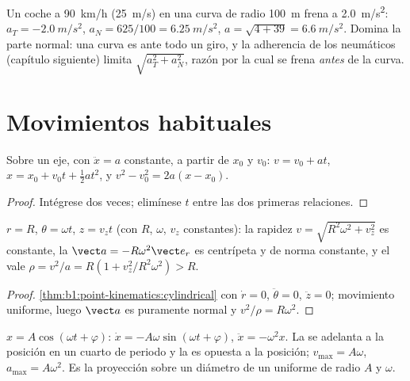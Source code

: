 \begin{example}\label{ex:b1:point-kinematics:bend}
Un coche a \qty{90}{km/h} (\qty{25}{m/s}) en una curva de radio
\qty{100}{m} frena a \qty{2.0}{m/s^2}: $a_T = \qty{-2.0}{m/s^2}$, $a_N = 625/100 =
\qty{6.25}{m/s^2}$, $a = \sqrt{4 + 39} = \qty{6.6}{m/s^2}$. Domina la
parte normal: una curva es ante todo un giro, y la adherencia de los
neumáticos (capítulo siguiente) limita $\sqrt{a_T^2 + a_N^2}$, razón por
la cual se frena \emph{antes} de la curva.
\end{example}

\section{Movimientos habituales}

\begin{proposition}\label{prop:b1:point-kinematics:uarm}
Sobre un eje, con $\ddot x = a$ constante, a partir de $x_0$ y $v_0$:
$v = v_0 + at$, $x = x_0 + v_0t + \tfrac12 at^2$, y
$v^2 - v_0^2 = 2a(x - x_0)$.
\end{proposition}

\begin{proof}
Intégrese dos veces; elimínese $t$ entre las dos primeras relaciones.
\end{proof}

\begin{proposition}\label{prop:b1:point-kinematics:helix}
$r = R$, $\theta = \omega t$, $z = v_zt$ (con $R$, $\omega$, $v_z$
constantes): la rapidez $v = \sqrt{R^2\omega^2 + v_z^2}$ es constante, la
 $\vect a = -R\omega^2\vect e_r$ es centrípeta y de norma
constante, y el  vale $\rho = v^2/a = R(1 + v_z^2/R^2\omega^2) > R$.
\end{proposition}

\begin{proof}
\cref{thm:b1:point-kinematics:cylindrical} con $\dot r = 0$,
$\ddot\theta = 0$, $\ddot z = 0$; movimiento uniforme, luego $\vect a$ es
puramente normal y $v^2/\rho = R\omega^2$.
\end{proof}

\begin{proposition}\label{prop:b1:point-kinematics:harmonic}
$x = A\cos(\omega t + \varphi)$: $\dot x = -A\omega\sin(\omega t + \varphi)$,
$\ddot x = -\omega^2 x$. La  se adelanta a la posición en un
cuarto de periodo y la  es opuesta a la posición; $v_{\max} =
A\omega$, $a_{\max} = A\omega^2$. Es la proyección sobre un diámetro de un
 uniforme de radio $A$ y  $\omega$.
\end{proposition}

